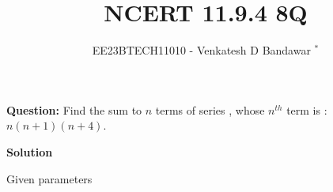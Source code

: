 \documentclass[journal,12pt,twocolumn]{IEEEtran}
\theoremstyle{remark}
\begin{document}

\vspace{3cm}

\title{NCERT 11.9.4 8Q}
\author{EE23BTECH11010 - Venkatesh D Bandawar $^{*}$%
}
\maketitle
\bigskip

\renewcommand{\thefigure}{\theenumi}
\renewcommand{\thetable}{\theenumi}

\textbf{Question:} Find the sum to $n$ terms of series , whose $n^{th}$ term is : $n(n+1)(n+4)$.

\textbf{Solution}
\begin{table}[!h] 
\centering

\caption{Given parameters}
\label{given parameters list}
\end{table}
\end{document}
